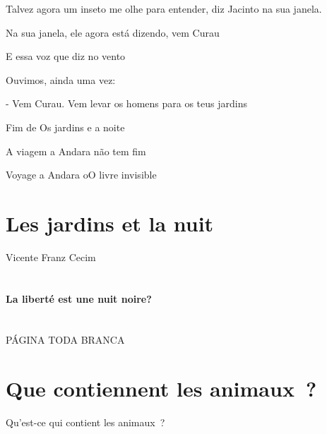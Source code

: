 Talvez agora um inseto me olhe para entender, diz Jacinto na sua janela.

Na sua janela, ele agora está dizendo, vem Curau

E essa voz que diz no vento

Ouvimos, ainda uma vez:

- Vem Curau. Vem levar os homens para os teus jardins

Fim de Os jardins e a noite

A viagem a Andara não tem fim

Voyage a Andara oO livre invisible

\section{Les jardins et la nuit}\label{les-jardins-et-la-nuit}

Vicente Franz Cecim

\section{}\label{section}

\textbf{La liberté est une nuit noire?}

\section{}\label{section-1}

\section{}\label{section-2}

\section{}\label{section-3}

PÁGINA TODA BRANCA

\section{}\label{section-4}

\section{\texorpdfstring{\textbf{Que contiennent les
animaux~?}}{Que contiennent les animaux~?}}\label{que-contiennent-les-animaux}

Qu'est-ce qui contient les animaux~?

